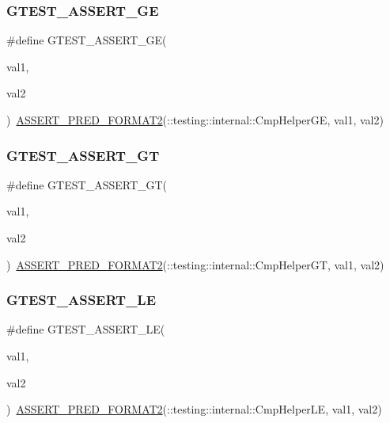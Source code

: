 \subsubsection{\texorpdfstring{GTEST\_ASSERT\_GE}{GTEST\_ASSERT\_GE}}
{\footnotesize\ttfamily \#define G\+T\+E\+S\+T\+\_\+\+A\+S\+S\+E\+R\+T\+\_\+\+GE(\begin{DoxyParamCaption}\item[{}]{val1,  }\item[{}]{val2 }\end{DoxyParamCaption})~\mbox{\hyperlink{_obj__test_2lib_2googletest-release-1_88_81_2googletest_2include_2gtest_2gtest__pred__impl_8h_ac452685a1a98ea3d96eb956a062ee210}{A\+S\+S\+E\+R\+T\+\_\+\+P\+R\+E\+D\+\_\+\+F\+O\+R\+M\+A\+T2}}(\+::testing\+::internal\+::\+Cmp\+Helper\+GE, val1, val2)}

\mbox{\label{_obj__test_2lib_2googletest-release-1_88_81_2googletest_2include_2gtest_2gtest_8h_a088b9056fd1c1f316b41c22f64deb33a}} 
\subsubsection{\texorpdfstring{GTEST\_ASSERT\_GT}{GTEST\_ASSERT\_GT}}
{\footnotesize\ttfamily \#define G\+T\+E\+S\+T\+\_\+\+A\+S\+S\+E\+R\+T\+\_\+\+GT(\begin{DoxyParamCaption}\item[{}]{val1,  }\item[{}]{val2 }\end{DoxyParamCaption})~\mbox{\hyperlink{_obj__test_2lib_2googletest-release-1_88_81_2googletest_2include_2gtest_2gtest__pred__impl_8h_ac452685a1a98ea3d96eb956a062ee210}{A\+S\+S\+E\+R\+T\+\_\+\+P\+R\+E\+D\+\_\+\+F\+O\+R\+M\+A\+T2}}(\+::testing\+::internal\+::\+Cmp\+Helper\+GT, val1, val2)}

\mbox{\label{_obj__test_2lib_2googletest-release-1_88_81_2googletest_2include_2gtest_2gtest_8h_abef04dcd4a0259d378de7b3b3ffb6730}} 
\subsubsection{\texorpdfstring{GTEST\_ASSERT\_LE}{GTEST\_ASSERT\_LE}}
{\footnotesize\ttfamily \#define G\+T\+E\+S\+T\+\_\+\+A\+S\+S\+E\+R\+T\+\_\+\+LE(\begin{DoxyParamCaption}\item[{}]{val1,  }\item[{}]{val2 }\end{DoxyParamCaption})~\mbox{\hyperlink{_obj__test_2lib_2googletest-release-1_88_81_2googletest_2include_2gtest_2gtest__pred__impl_8h_ac452685a1a98ea3d96eb956a062ee210}{A\+S\+S\+E\+R\+T\+\_\+\+P\+R\+E\+D\+\_\+\+F\+O\+R\+M\+A\+T2}}(\+::testing\+::internal\+::\+Cmp\+Helper\+LE, val1, val2)}

